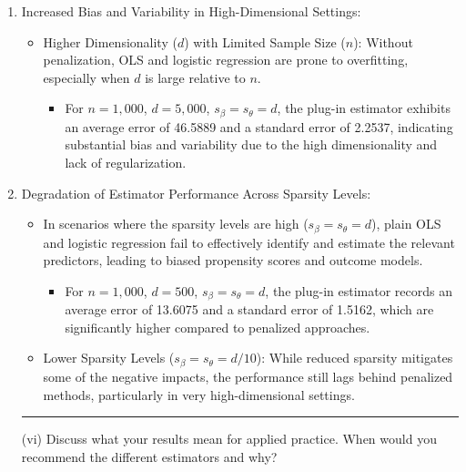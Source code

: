 \documentclass{article}
\newenvironment{colorparagraph}[1]{\par\color{#1}}{\par}
\begin{document}
\begin{enumerate}
  \item Increased Bias and Variability in High-Dimensional Settings:
    \begin{itemize}
      \item Higher Dimensionality (\( d \)) with Limited Sample Size (\( n \)): Without penalization, OLS and logistic regression are prone to overfitting, especially when \( d \) is large relative to \( n \).
        \begin{itemize}
          \item For \( n = 1,000 \), \( d = 5,000 \), \( s_\beta = s_\theta = d \), the plug-in estimator exhibits an average error of 46.5889 and a standard error of 2.2537, indicating substantial bias and variability due to the high dimensionality and lack of regularization.
        \end{itemize}
    \end{itemize}

  \item Degradation of Estimator Performance Across Sparsity Levels:
    \begin{itemize}
      \item In scenarios where the sparsity levels are high (\( s_\beta = s_\theta = d \)), plain OLS and logistic regression fail to effectively identify and estimate the relevant predictors, leading to biased propensity scores and outcome models.
        \begin{itemize}
          \item For \( n = 1,000 \), \( d = 500 \), \( s_\beta = s_\theta = d \), the plug-in estimator records an average error of 13.6075 and a standard error of 1.5162, which are significantly higher compared to penalized approaches.
        \end{itemize}
      \item Lower Sparsity Levels (\( s_\beta = s_\theta = d/10 \)): While reduced sparsity mitigates some of the negative impacts, the performance still lags behind penalized methods, particularly in very high-dimensional settings.
    \end{itemize}

\begin{colorparagraph}{questioncolor}
  \rule{\textwidth}{0.5pt}
  
  \vspace{.2cm}
(vi) Discuss what your results mean for applied practice. When would you recommend the different estimators and why?


\end{colorparagraph}
\end{enumerate}
\end{document}
